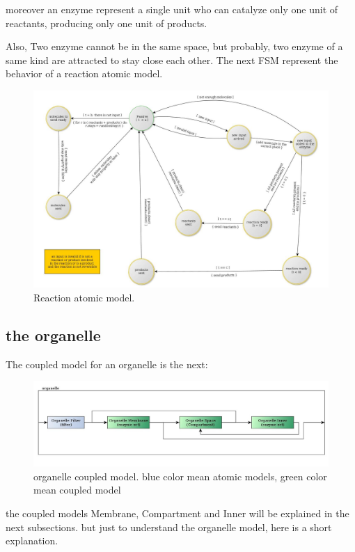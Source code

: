 \documentclass[12pt]{article}
\begin{document}
moreover an enzyme represent a single unit who can catalyze only one unit of reactants, producing only one unit of products. 

Also, Two enzyme cannot be in the same space, but probably, two enzyme of a same kind are attracted to stay close each other.
The next FSM represent the behavior of a reaction atomic model.

\begin{figure}[h!]
 \centering
  \includegraphics[width=1\textwidth]{atomic-reaction.jpg}
 \caption{Reaction atomic model.}
\end{figure}

\subsection*{the organelle}

The coupled model for an organelle is the next:

\begin{figure}[h!]
 \centering
  \includegraphics[width=1\textwidth]{coupled-organelle.jpg}
 \caption{organelle coupled model. blue color mean atomic models, green color mean coupled model}
\end{figure}

the coupled models Membrane, Compartment and Inner will be explained in the next subsections. but just to understand the organelle model, here is a short explanation.
\end{document}

